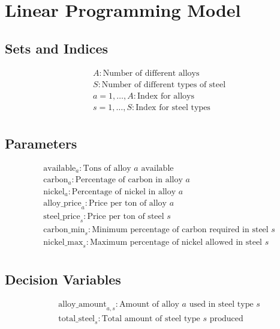 \documentclass{article}
\begin{document}
\section*{Linear Programming Model}

\subsection*{Sets and Indices}
\begin{align*}
  & A: \text{Number of different alloys} \\
  & S: \text{Number of different types of steel} \\
  & a = 1, \ldots, A: \text{Index for alloys} \\
  & s = 1, \ldots, S: \text{Index for steel types} \\
\end{align*}

\subsection*{Parameters}
\begin{align*}
  & \text{available}_a: \text{Tons of alloy } a \text{ available} \\
  & \text{carbon}_a: \text{Percentage of carbon in alloy } a \\
  & \text{nickel}_a: \text{Percentage of nickel in alloy } a \\
  & \text{alloy\_price}_a: \text{Price per ton of alloy } a \\
  & \text{steel\_price}_s: \text{Price per ton of steel } s \\
  & \text{carbon\_min}_s: \text{Minimum percentage of carbon required in steel } s \\
  & \text{nickel\_max}_s: \text{Maximum percentage of nickel allowed in steel } s \\
\end{align*}

\subsection*{Decision Variables}
\begin{align*}
  & \text{alloy\_amount}_{a,s}: \text{Amount of alloy } a \text{ used in steel type } s \\
  & \text{total\_steel}_s: \text{Total amount of steel type } s \text{ produced} \\
\end{align*}
\end{document}
